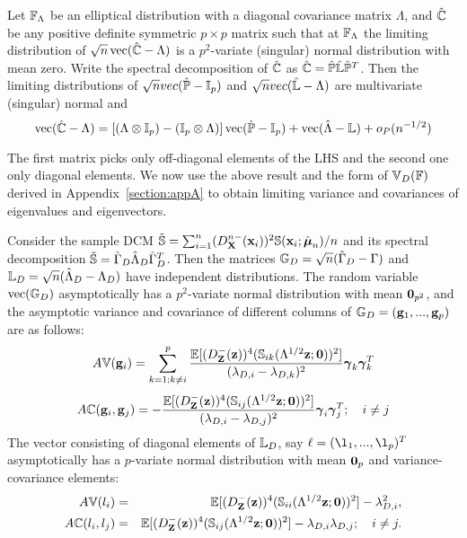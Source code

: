 \begin{Theorem}
\label{Theorem:decomp} \citep{taskinen12}
Let ${\mathbb{F}}_\Lambda$ be an elliptical distribution with a diagonal covariance matrix $\Lambda$, and $\hat {{\mathbb{C}}}$ be any positive definite symmetric $p \times p$ matrix such that at ${\mathbb{F}}_\Lambda$ the limiting distribution of $\sqrt n \operatorname*{vec} (\hat {{\mathbb{C}}} - \Lambda)$ is a $p^2$-variate (singular) normal distribution with mean zero. Write the spectral decomposition of $\hat {{\mathbb{C}}}$ as $\hat {{\mathbb{C}}} = \hat {{\mathbb{P}}} \hat {{\mathbb{L}}} \hat {{\mathbb{P}}}^T$. Then the limiting distributions of $\sqrt n vec(\hat {{\mathbb{P}}} - {\mathbb{I}}_p)$ and $\sqrt n vec(\hat{{\mathbb{L}}} - \Lambda)$ are multivariate (singular) normal and
%
\begin{equation} \label{equation:decompEq}
\operatorname*{vec} (\hat {{\mathbb{C}}} - \Lambda) =
\left[ (\Lambda \otimes {\mathbb{I}}_p) - ({\mathbb{I}}_p \otimes \Lambda) \right]
\operatorname*{vec} (\hat {{\mathbb{P}}} - {\mathbb{I}}_p) + \operatorname*{vec} (\hat\Lambda - {\mathbb{L}}) + o_P(n^{-1/2})
\end{equation}
\end{Theorem}

The first matrix picks only off-diagonal elements of the LHS and the second one only diagonal elements. We now use the above result and the form of ${\mathbb{V}}_D({\mathbb{F}})$ derived in Appendix~\ref{section:appA} to obtain limiting variance and covariances of eigenvalues and eigenvectors.

\begin{Corollary} \label{Corollary:eigendist}
Consider the sample DCM $ \tilde {{\mathbb{S}}} = \sum_{i=1}^n (D^{n-}_{\mathbf{X}} ({\bf{x}}_i))^2 {\mathbb{S}} ({\bf{x}}_i; \hat{{\boldsymbol{\mu}}}_n)/n $ and its spectral decomposition $\tilde {{\mathbb{S}}} = \hat\Gamma_D \hat\Lambda_D \hat\Gamma_D^T $. Then the matrices ${\mathbb{G}}_D = \sqrt n (\hat\Gamma_D - \Gamma) $ and ${\mathbb{L}}_D = \sqrt n (\hat\Lambda_D - \Lambda_{D}) $ have independent distributions. The random variable $\operatorname*{vec}({\mathbb{G}}_D)$ asymptotically has a $p^2$-variate normal distribution with mean ${\bf 0}_{p^2}$, and the asymptotic variance and covariance of different columns of ${\mathbb{G}}_D = ({\bf{g}}_1,...,{\bf{g}}_p)$ are as follows:
%
\begin{equation} \label{equation:DevEq}
A{\mathbb{V}}({\bf{g}}_i) = \sum_{k=1; k \neq i}^p \frac{{\mathbb{E}} [ (D^-_{\mathbf{Z}} ({\bf{z}}))^4 ({\mathbb{S}}_{ik}( \Lambda^{1/2} {\bf{z}}; {\bf 0}))^2 ]}
{(\lambda_{D,i} - \lambda_{D,k})^2} {\boldsymbol{\gamma}}_k {\boldsymbol{\gamma}}_k^T
\end{equation}
%
\begin{equation}
A{\mathbb{C}}( {\bf{g}}_i, {\bf{g}}_j) = - \frac{{\mathbb{E}} [ (D^-_{\mathbf{Z}} ({\bf{z}}))^4 ({\mathbb{S}}_{ij}( \Lambda^{1/2} {\bf{z}}; {\bf 0}))^2 ]}
{(\lambda_{D,i} - \lambda_{D,j})^2} {\boldsymbol{\gamma}}_i {\boldsymbol{\gamma}}_j^T; \quad i \neq j
\end{equation}
%
The vector consisting of diagonal elements of ${\mathbb{L}}_D$, say $\mathbf{\ell} = (\l_1,...,\l_p)^T$ asymptotically has a $p$-variate normal distribution with mean ${\bf 0}_p$ and variance-covariance elements:
%
\begin{eqnarray}
A{\mathbb{V}}(l_i) &=&{\mathbb{E}} [ (D^-_{\mathbf{Z}} ({\bf{z}}))^4 ({\mathbb{S}}_{ii}( \Lambda^{1/2} {\bf{z}}; {\bf 0}))^2 ] - \lambda_{D,i}^2,\\
A{\mathbb{C}}(l_i, l_j) &=& {\mathbb{E}} [ (D^-_{\mathbf{Z}} ({\bf{z}}))^4 ({\mathbb{S}}_{ij}( \Lambda^{1/2} {\bf{z}}; {\bf 0}))^2 ] - \lambda_{D,i} \lambda_{D,j}; \quad i \neq j.
\end{eqnarray}
%
\end{Corollary}


